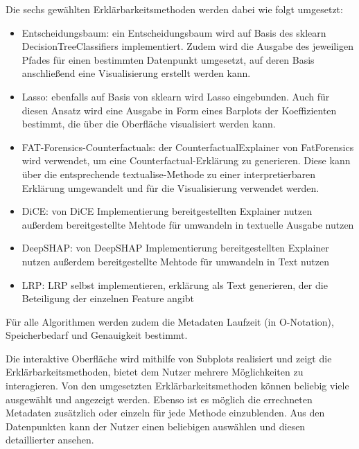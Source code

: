 Die sechs gewählten Erklärbarkeitsmethoden werden dabei wie folgt umgesetzt:
\begin{itemize}
	\item Entscheidungsbaum: ein Entscheidungsbaum wird auf Basis des sklearn DecisionTreeClassifiers  implementiert. Zudem wird die Ausgabe des jeweiligen Pfades für einen bestimmten Datenpunkt umgesetzt, auf deren Basis anschließend eine Visualisierung erstellt werden kann.
	
	\item Lasso: ebenfalls auf Basis von sklearn wird Lasso  eingebunden. Auch für diesen Ansatz wird eine Ausgabe in Form eines Barplots der Koeffizienten bestimmt, die über die Oberfläche visualisiert werden kann. 
	
	\item FAT-Forensics-Counterfactuals: der CounterfactualExplainer  von FatForensics wird verwendet, um eine Counterfactual-Erklärung zu generieren. Diese kann über die entsprechende textualise-Methode zu einer interpretierbaren Erklärung umgewandelt und für die Visualisierung verwendet werden.
	
	\item DiCE: von DiCE Implementierung bereitgestellten Explainer nutzen 
	außerdem bereitgestellte Mehtode für umwandeln in textuelle Ausgabe nutzen 
	
	\item DeepSHAP: von DeepSHAP Implementierung bereitgestellten Explainer nutzen
	außerdem bereitgestellte Mehtode für umwandeln in Text nutzen 
	
	\item LRP: LRP selbst implementieren, erklärung als Text generieren, der die Beteiligung der einzelnen Feature angibt 
	
\end{itemize}

Für alle Algorithmen werden zudem die Metadaten Laufzeit (in O-Notation), Speicherbedarf und Genauigkeit bestimmt.

Die interaktive Oberfläche wird mithilfe von Subplots realisiert und zeigt die Erklärbarkeitsmethoden, bietet dem Nutzer mehrere Möglichkeiten zu interagieren. Von den umgesetzten Erklärbarkeitsmethoden können beliebig viele ausgewählt und angezeigt werden. Ebenso ist es möglich die errechneten Metadaten zusätzlich oder einzeln für jede Methode einzublenden. Aus den Datenpunkten kann der Nutzer einen beliebigen auswählen und diesen detaillierter ansehen.

